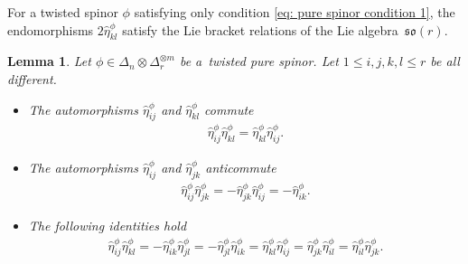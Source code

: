 \documentclass[10pt,a4paper]{amsart}
\numberwithin{equation}{section}
\newtheorem{Lemma}[Theorem]{Lemma}
\begin{document}
\begin{Remark} For a twisted spinor $\phi$ satisfying only condition \eqref{eq: pure spinor condition 1}, the endomorphisms $2\hat\eta_{kl}^\phi$ satisfy the Lie bracket relations of the Lie algebra~$\mathfrak{so}(r)$.
\end{Remark}

\begin{Lemma}\label{lemma:clifford-relations} Let $\phi\in\Delta_n\otimes\Delta_r^{\otimes m}$ be a~twisted pure spinor. Let $1\leq i,j,k,l\leq r$ be all different.
\begin{itemize}\itemsep=0pt
 \item The automorphisms $\hat\eta_{ij}^\phi$ and $\hat\eta_{kl}^\phi$ commute
\begin{gather}
\hat\eta_{ij}^\phi\hat\eta_{kl}^\phi=\hat\eta_{kl}^\phi\hat\eta_{ij}^\phi.\label{ij.kl=kl.ij}
\end{gather}
\item The automorphisms $\hat\eta_{ij}^\phi$
and $\hat\eta_{jk}^\phi$ anticommute
\begin{gather}
\hat\eta_{ij}^\phi\hat\eta_{jk}^\phi =-\hat\eta_{jk}^\phi\hat\eta_{ij}^\phi =- \hat\eta_{ik}^\phi.\label{ij.jk=-jk.ij}
\end{gather}
\item The following identities hold
\begin{gather}
 \hat\eta_{ij}^\phi\hat\eta_{kl}^\phi = -\hat\eta_{ik}^\phi\hat\eta_{jl}^\phi
 = -\hat\eta_{jl}^\phi\hat\eta_{ik}^\phi = \hat\eta_{kl}^\phi\hat\eta_{ij}^\phi = \hat\eta_{jk}^\phi\hat\eta_{il}^\phi
 = \hat\eta_{il}^\phi\hat\eta_{jk}^\phi.\label{eq:ijkl=-ikjl}
\end{gather}
\end{itemize}
\end{Lemma}
\end{document}
